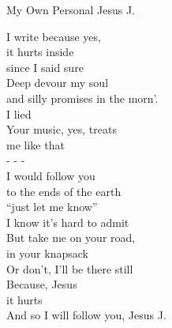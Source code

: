 My Own Personal Jesus J.

I write because yes,\\
it hurts inside\\
since I said sure\\
Deep devour my soul\\
and silly promises in the morn'.\\
I lied\\
Your music, yes, treats\\
me like that\\
- - -\\
I would follow you\\
to the ends of the earth\\
``just let me know''\\
I know it's hard to admit\\
But take me on your road,\\
in your knapsack\\
Or don't, I'll be there still\\
Because, Jesus\\
it hurts\\
And so I will follow you, Jesus J.\\

